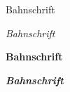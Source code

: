 \documentclass{article}
\begin{document}
    Bahnschrift
    
    \textit{Bahnschrift}
    
    \textbf{Bahnschrift}
    
    \textbf{\textit{Bahnschrift}}
    
\end{document}
